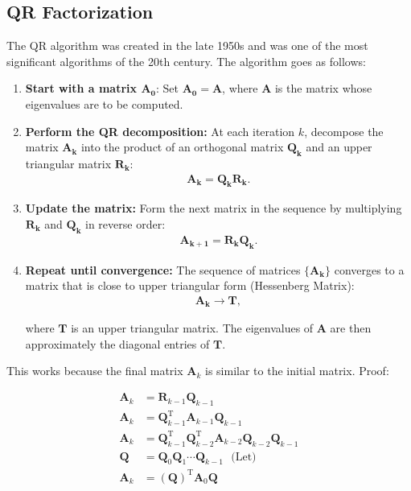 \documentclass[12pt,a4paper]{article}
\let\vec\mathbf
\begin{document}
\subsection{QR Factorization}

The QR algorithm was created in the late 1950s and was one of the most significant algorithms of the 20th century. The algorithm goes as follows:

\begin{enumerate}
    \item \textbf{Start with a matrix \( \vec{A_0} \)}:
    Set \( \vec{A_0} = \vec{A} \), where \( \vec{A} \) is the matrix whose eigenvalues are to be computed.

    \item \textbf{Perform the QR decomposition:}
    At each iteration \( k \), decompose the matrix \( \vec{A_k} \) into the product of an orthogonal matrix \( \vec{Q_k} \) and an upper triangular matrix \( \vec{R_k} \):
    \begin{align}
        \vec{A_k} = \vec{Q_k} \vec{R_k}.
    \end{align}

    \item \textbf{Update the matrix:} Form the next matrix in the sequence by multiplying \( \vec{R_k} \) and \( \vec{Q_k} \) in reverse order:
    \begin{align}
        \vec{A_{k+1}} = \vec{R_k} \vec{Q_k}.
    \end{align}

    \item \textbf{Repeat until convergence:} The sequence of matrices \( \{\vec{A_k}\} \) converges to a matrix that is close to upper triangular form (Hessenberg Matrix):
    \begin{align}
    \vec{A_k} \to \vec{T},
    \end{align}

    where \( \vec{T} \) is an upper triangular matrix. The eigenvalues of \( \vec{A} \) are then approximately the diagonal entries of \( \vec{T} \).
\end{enumerate}

\noindent This works because the final matrix \( \vec{A}_k \) is similar to the initial matrix. Proof:

\begin{align}
    \vec{A}_k &= \vec{R}_{k-1} \vec{Q}_{k-1}\\
    \vec{A}_k &= \vec{Q}_{k-1}^\text{T} \vec{A}_{k-1} \vec{Q}_{k-1}\\
    \vec{A}_k &= \vec{Q}_{k-1}^\text{T} \vec{Q}_{k-2}^\text{T} \vec{A}_{k-2} \vec{Q}_{k-2} \vec{Q}_{k-1}\\
    \vec{Q} &= \vec{Q}_0 \vec{Q}_1 \cdots \vec{Q}_{k-1} \ \ \ \text{(Let)} \\
    \vec{A}_k &= (\vec{Q})^\text{T} \vec{A}_0 \vec{Q} \label{similarity equation}
\end{align}
\end{document}
